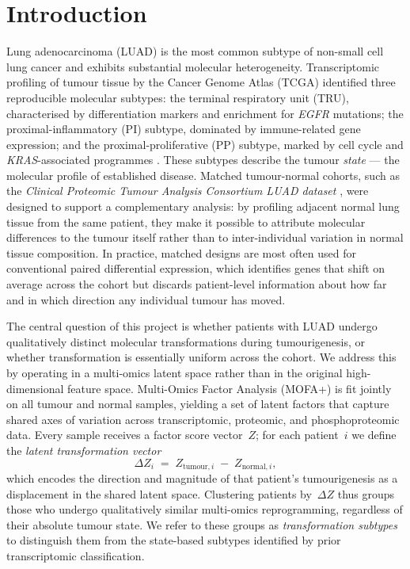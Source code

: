 \section{Introduction}

Lung adenocarcinoma (LUAD) is the most common subtype of non-small cell lung cancer and
exhibits substantial molecular heterogeneity.
Transcriptomic profiling of tumour tissue by the Cancer Genome Atlas (TCGA) identified three
reproducible molecular subtypes: the terminal respiratory unit (TRU), characterised by
differentiation markers and enrichment for \textit{EGFR} mutations; the proximal-inflammatory
(PI) subtype, dominated by immune-related gene expression; and the proximal-proliferative (PP)
subtype, marked by cell cycle and \textit{KRAS}-associated programmes \cite{tcga2014luad}.
These subtypes describe the tumour \emph{state} --- the molecular profile of established
disease.
Matched tumour-normal cohorts, such as the \textit{Clinical Proteomic Tumour Analysis Consortium
LUAD dataset} \cite{gillette2020proteogenomic}, were designed to support a complementary
analysis: by profiling adjacent normal lung tissue from the same patient, they make it
possible to attribute molecular differences to the tumour itself rather than to inter-individual
variation in normal tissue composition.
In practice, matched designs are most often used for conventional paired differential expression,
which identifies genes that shift on average across the cohort but discards patient-level
information about how far and in which direction any individual tumour has moved.

The central question of this project is whether patients with LUAD undergo qualitatively
distinct molecular transformations during tumourigenesis, or whether transformation is
essentially uniform across the cohort.
We address this by operating in a multi-omics latent space rather than in the original
high-dimensional feature space.
Multi-Omics Factor Analysis (MOFA+) \cite{argelaguet2020mofa2} is fit jointly on all
tumour and normal samples, yielding a set of latent factors that capture shared axes of
variation across transcriptomic, proteomic, and phosphoproteomic data.
Every sample receives a factor score vector~$Z$; for each patient~$i$ we define the
\emph{latent transformation vector}
\begin{equation}
    \Delta Z_i \;=\; Z_{\text{tumour},i} \;-\; Z_{\text{normal},i},
    \label{eq:deltaz}
\end{equation}
which encodes the direction and magnitude of that patient's tumourigenesis as a displacement
in the shared latent space.
Clustering patients by~$\Delta Z$ thus groups those who undergo qualitatively similar
multi-omics reprogramming, regardless of their absolute tumour state.
We refer to these groups as \emph{transformation subtypes} to distinguish them from
the state-based subtypes identified by prior transcriptomic classification.


